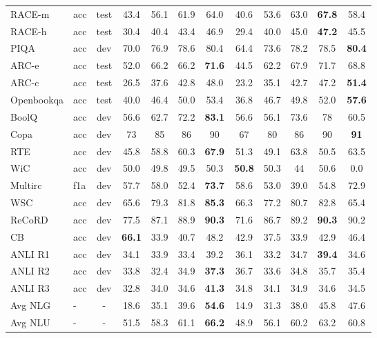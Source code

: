 \documentclass{article}
\begin{document}
\begin{table*}[htb]
\begin{tabular}{llcccccccccc}
        RACE-m & acc & test & 43.4& 56.1& 61.9& 64.0& 40.6& 53.6& 63.0& \textbf{67.8} & 58.4\\
        RACE-h & acc & test & 30.4& 40.4& 43.4& 46.9& 29.4& 40.0& 45.0& \textbf{47.2} & 45.5\\
        \addlinespace
        PIQA & acc & dev & 70.0 & 76.9 & 78.6 & 80.4& 64.4& 73.6& 78.2& 78.5& \textbf{80.4}\\
        ARC-e & acc & test & 52.0& 66.2& 66.2& \textbf{71.6} & 44.5& 62.2& 67.9& 71.7& 68.8\\
        ARC-c & acc & test & 26.5& 37.6& 42.8& 48.0& 23.2& 35.1& 42.7& 47.2& \textbf{51.4}\\
        Openbookqa & acc & test & 40.0& 46.4& 50.0& 53.4& 36.8& 46.7& 49.8& 52.0& \textbf{57.6}\\
        \addlinespace
        BoolQ & acc & dev & 56.6& 62.7& 72.2& \textbf{83.1} & 56.6& 56.1& 73.6& 78& 60.5\\
        Copa & acc & dev & 73& 85& 86& 90& 67& 80& 86& 90& \textbf{91}\\
        RTE & acc & dev & 45.8& 58.8& 60.3& \textbf{67.9}& 51.3& 49.1& 63.8& 50.5& 63.5\\
        WiC & acc & dev & 50.0& 49.8& 49.5& 50.3& \textbf{50.8} & 50.3& 44& 50.6 & 0.0\\
        Multirc & f1a & dev & 57.7&	58.0&	52.4&	\textbf{73.7}&	58.6&	53.0&	39.0&	54.8&	72.9\\
        WSC & acc & dev & 65.6& 79.3& 81.8& \textbf{85.3}& 66.3& 77.2& 80.7& 82.8& 65.4\\
        ReCoRD & acc & dev & 77.5& 87.1& 88.9&	\textbf{90.3}&	71.6&	86.7&	89.2&\textbf{90.3}&	90.2\\
        CB & acc & dev & \textbf{66.1} & 33.9& 40.7& 48.2& 42.9& 37.5& 33.9& 42.9& 46.4\\
        \addlinespace
        ANLI R1 & acc & dev & 34.1& 33.9& 33.4& 39.2 & 36.1& 33.2& 34.7& \textbf{39.4} & 34.6\\
        ANLI R2 & acc & dev & 33.8& 32.4& 34.9& \textbf{37.3}& 36.7& 33.6& 34.8& 35.7& 35.4\\
        ANLI R3 & acc & dev & 32.8& 34.0& 34.6& \textbf{41.3}& 34.8& 34.1& 34.9& 34.6& 34.5\\
        \addlinespace
        Avg NLG & - & - & 18.6 & 35.1 & 39.6 & \textbf{54.6} & 14.9 & 31.3 & 38.0 & 45.8 & 47.6 \\ 
        Avg NLU & - & - & 51.5 & 58.3 & 61.1 & \textbf{66.2} & 48.9 & 56.1 & 60.2 & 63.2 & 60.8\\
        \bottomrule
    \end{tabular}

\end{table*}
\clearpage
\end{document}
